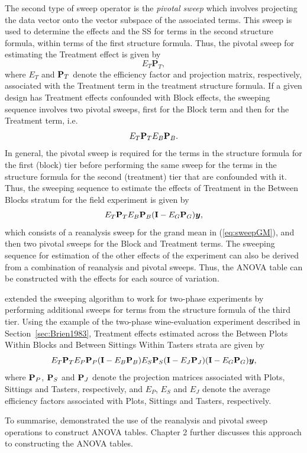 The second type of sweep operator is the \emph{pivotal sweep} which involves projecting the data vector onto the vector subspace of the associated terms. This sweep is used to determine the effects and the SS for terms in the second structure formula, within terms of the first structure formula. Thus, the pivotal sweep for estimating the Treatment effect is given by  
\[
E_T \mathbf{P}_T,
\]
where $E_{T}$ and $\mathbf{P}_{T}$ denote the efficiency factor and projection matrix, respectively, associated with the Treatment term in the treatment structure formula. If a given design has Treatment effects confounded with Block effects, the sweeping sequence involves two pivotal sweeps, first for the Block term and then for the Treatment term, i.e.\
\[ 
E_T \mathbf{P}_T E_B \mathbf{P}_B. 
\] 
In general, the pivotal sweep is required for the terms in the structure formula for the first (block) tier before performing the same sweep for the terms in the structure formula for the second (treatment) tier that are confounded with it. Thus, the sweeping sequence to estimate the effects of Treatment in the Between Blocks stratum for the field experiment is given by 
\[E_T \mathbf{P}_T E_B \mathbf{P}_B (\mathbf{I} - E_G \mathbf{P}_G)\bm{y},\] 
which consists of a reanalysis sweep for the grand mean in (\ref{eq:sweepGM}), and then two pivotal sweeps for the Block and Treatment terms. The sweeping sequence for estimation of the other effects of the experiment can also be derived from a combination of reanalysis and pivotal sweeps. Thus, the ANOVA table can be constructed with the effects for each source of variation. 

\cite{Brien1999} extended the sweeping algorithm to work for two-phase experiments by performing additional sweeps for terms from the structure formula of the third tier. Using the example of the two-phase wine-evaluation experiment described in Section~\ref{sec:Brien1983}, Treatment effects estimated across the Between Plots Within Blocks and Between Sittings Within Tasters strata are given by 
\[E_T \mathbf{P}_T E_P \mathbf{P}_P (\mathbf{I} - E_{B} \mathbf{P}_B) E_S \mathbf{P}_S (\mathbf{I} - E_{J} \mathbf{P}_J) (\mathbf{I} - E_{G} \mathbf{P}_G)\bm{y}, \]
where $\mathbf{P}_P$, $\mathbf{P}_S$ and $\mathbf{P}_J$ denote the projection matrices associated with Plots, Sittings and Tasters, respectively, and $E_P$, $E_S$ and $E_{J}$ denote the average efficiency factors associated with Plots, Sittings and Tasters, respectively.

To summarise, \cite{Brien1999} demonstrated the use of the reanalysis and pivotal sweep operations to construct ANOVA tables. Chapter 2 further discusses this approach to constructing the ANOVA tables.

